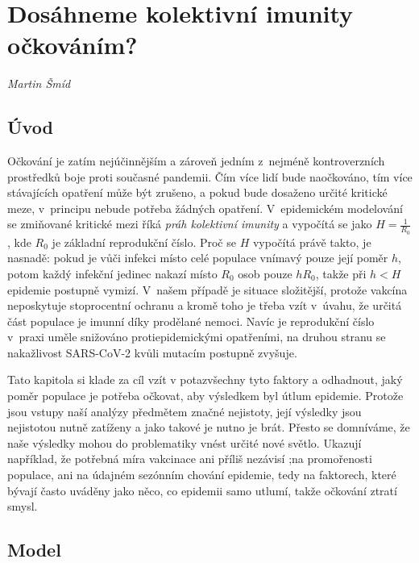 
\chapter{Dosáhneme kolektivní imunity o\v{c}kováním?} \label{Nekolik_poznamek}

\textit{Martin Šmíd}
\vspace{15mm}

\section*{Úvod}

\noindent Očkování je zatím nejúčinnějším a zároveň jedním z~nejméně kontroverzních pro\-střed\-ků boje proti současné pandemii. Čím více lidí bude naočkováno,
tím více stávajících opatření může být zrušeno, a pokud bude dosaženo určité kritické meze, v~principu nebude potřeba žádných opatření. V~epidemickém modelování se zmi\-ňo\-va\-né kritické mezi říká {\em práh kolektivní imunity} a vypočítá se jako $H=\frac{1}{R_0}$, kde $R_0$ je základní reprodukční číslo. Proč se $H$ vypočítá právě takto, je nasnadě: pokud je vůči infekci místo celé populace vnímavý pouze její poměr $h$, potom každý infekční jedinec nakazí místo $R_0$ osob pouze $h R_0$, takže při $h < H$ epidemie postupně vymizí. V~našem případě je situace složitější, protože vakcína neposkytuje stoprocentní ochranu a kromě toho je třeba vzít v~úvahu, že určitá část populace je imunní díky prodělané nemoci. Navíc je reprodukční číslo v~praxi uměle snižováno protiepidemickými opatřeními, na druhou stranu se nakažlivost SARS-CoV-2 kvůli mutacím postupně zvyšuje. 

Tato kapitola si klade za cíl vzít v potazvšechny tyto faktory a odhadnout, jaký poměr populace je potřeba očkovat, aby výsledkem byl útlum epidemie.
Protože jsou vstupy naší analýzy předmětem značné nejistoty, její výsledky jsou nejistotou nutně zatíženy a jako takové je nutno je brát. Přesto se domníváme, že naše výsledky mohou do problematiky vnést určité nové světlo. Ukazují například, že potřebná míra vakcinace ani příliš nezávisí
;na promořenosti populace, ani na údajném sezónním chování epidemie,
tedy na faktorech, které bývají často uváděny jako něco, co epidemii samo utlumí, takže očkování ztratí smysl.

\section*{Model}

